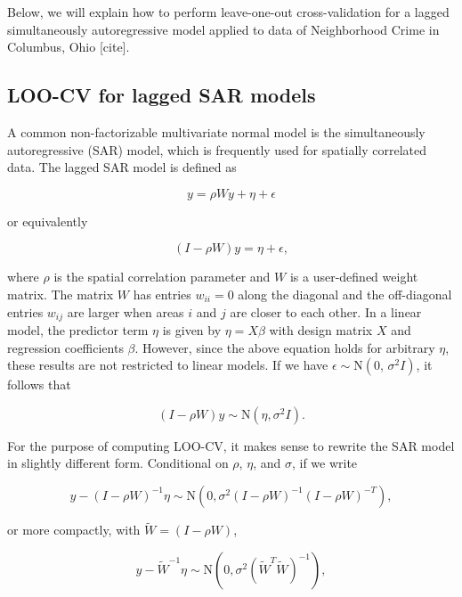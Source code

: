 \documentclass[english,,doc,floatsintext]{apa6}
\theoremstyle{definition}
\theoremstyle{definition}
\theoremstyle{definition}
\theoremstyle{remark}
\begin{document}
Below, we will explain how to perform leave-one-out cross-validation for
a lagged simultaneously autoregressive model applied to data of
Neighborhood Crime in Columbus, Ohio {[}cite{]}.

\hypertarget{loo-cv-for-lagged-sar-models}{%
\subsection{LOO-CV for lagged SAR
models}\label{loo-cv-for-lagged-sar-models}}

A common non-factorizable multivariate normal model is the
simultaneously autoregressive (SAR) model, which is frequently used for
spatially correlated data. The lagged SAR model is defined as

\begin{equation}
y = \rho Wy + \eta + \epsilon
\end{equation}

or equivalently

\begin{equation}
(I - \rho W)y = \eta + \epsilon,
\end{equation}

where \(\rho\) is the spatial correlation parameter and \(W\) is a
user-defined weight matrix. The matrix \(W\) has entries \(w_{ii} = 0\)
along the diagonal and the off-diagonal entries \(w_{ij}\) are larger
when areas \(i\) and \(j\) are closer to each other. In a linear model,
the predictor term \(\eta\) is given by \(\eta = X \beta\) with design
matrix \(X\) and regression coefficients \(\beta\). However, since the
above equation holds for arbitrary \(\eta\), these results are not
restricted to linear models. If we have
\(\epsilon \sim {\mathrm N}(0, \,\sigma^2 I)\), it follows that

\begin{equation}
(I - \rho W)y \sim {\mathrm N}(\eta, \sigma^2 I).
\end{equation}

For the purpose of computing LOO-CV, it makes sense to rewrite the SAR
model in slightly different form. Conditional on \(\rho\), \(\eta\), and
\(\sigma\), if we write

\begin{equation}
y-(I-\rho W)^{-1}\eta \sim {\mathrm N}(0, \sigma^2(I-\rho W)^{-1}(I-\rho W)^{-T}),
\end{equation}

or more compactly, with \(\widetilde{W}=(I-\rho W)\),

\begin{equation}
y-\widetilde{W}^{-1}\eta \sim {\mathrm N}(0, \sigma^2(\widetilde{W}^{T}\widetilde{W})^{-1}),
\end{equation}
\end{document}
